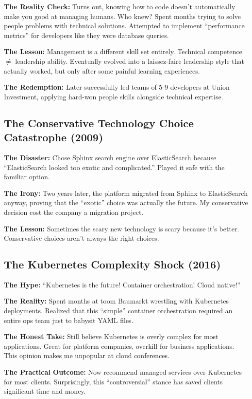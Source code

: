 \documentclass[11pt,a4paper]{article}
\begin{document}
\textbf{The Reality Check:} Turns out, knowing how to code doesn't automatically make you good at managing humans. Who knew? Spent months trying to solve people problems with technical solutions. Attempted to implement ``performance metrics'' for developers like they were database queries.

\textbf{The Lesson:} Management is a different skill set entirely. Technical competence $\neq$ leadership ability. Eventually evolved into a laissez-faire leadership style that actually worked, but only after some painful learning experiences.

\textbf{The Redemption:} Later successfully led teams of 5-9 developers at Union Investment, applying hard-won people skills alongside technical expertise.

\subsection{The Conservative Technology Choice Catastrophe (2009)}
\textbf{The Disaster:} Chose Sphinx search engine over ElasticSearch because ``ElasticSearch looked too exotic and complicated.'' Played it safe with the familiar option.

\textbf{The Irony:} Two years later, the platform migrated from Sphinx to ElasticSearch anyway, proving that the ``exotic'' choice was actually the future. My conservative decision cost the company a migration project.

\textbf{The Lesson:} Sometimes the scary new technology is scary because it's better. Conservative choices aren't always the right choices.

\subsection{The Kubernetes Complexity Shock (2016)}
\textbf{The Hype:} ``Kubernetes is the future! Container orchestration! Cloud native!''

\textbf{The Reality:} Spent months at toom Baumarkt wrestling with Kubernetes deployments. Realized that this ``simple'' container orchestration required an entire ops team just to babysit YAML files.

\textbf{The Honest Take:} Still believe Kubernetes is overly complex for most applications. Great for platform companies, overkill for business applications. This opinion makes me unpopular at cloud conferences.

\textbf{The Practical Outcome:} Now recommend managed services over Kubernetes for most clients. Surprisingly, this ``controversial'' stance has saved clients significant time and money.
\end{document}
